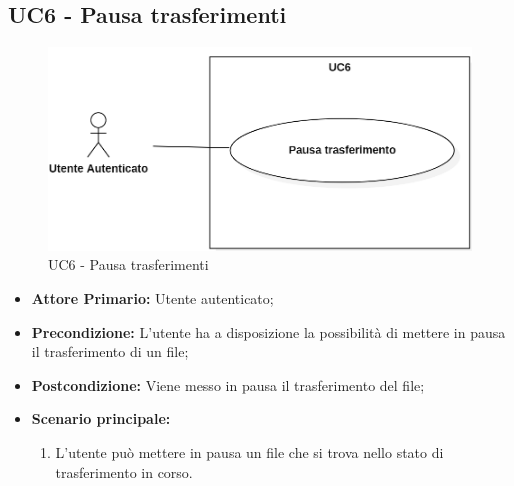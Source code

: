 \subsection{UC6 - Pausa trasferimenti}
\begin{figure}[H]
    \centering
    \includegraphics[scale = 0.4]{components/img/UC6.png}
    \caption{UC6 - Pausa trasferimenti}
\end{figure}
\begin{itemize}
\item \textbf{Attore Primario:} Utente autenticato;
\item \textbf{Precondizione:} L'utente ha a disposizione la possibilità di mettere in pausa il trasferimento di un file;
\item \textbf{Postcondizione:} Viene messo in pausa il trasferimento del file;
\item \textbf{Scenario principale:}
    \begin{enumerate}
    \item L'utente può mettere in pausa un file che si trova nello stato di trasferimento in corso.
    \end{enumerate}
\end{itemize}